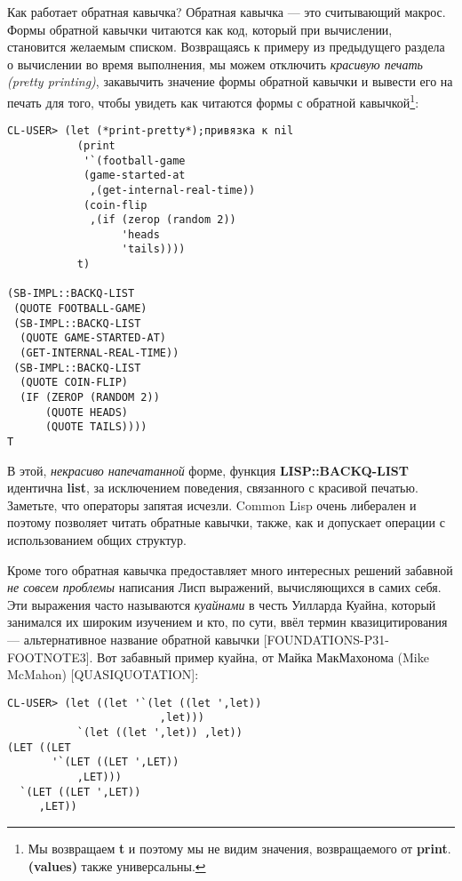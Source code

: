 Как работает обратная кавычка? Обратная кавычка --- это считывающий макрос. Формы обратной кавычки читаются как код, который при вычислении, становится желаемым списком. Возвращаясь к примеру из предыдущего раздела о вычислении во время выполнения, мы можем отключить \emph{красивую печать (pretty printing)}, закавычить значение формы обратной кавычки и вывести его на печать для того, чтобы увидеть как читаются формы с обратной кавычкой\footnote{Мы возвращаем \textbf{t} и поэтому мы не видим значения, возвращаемого от \textbf{print}. \textbf{(values)} также универсальны.}:

\begin{verbatim}
CL-USER> (let (*print-pretty*);привязка к nil
           (print
            '`(football-game
            (game-started-at
             ,(get-internal-real-time))
            (coin-flip
             ,(if (zerop (random 2))
                  'heads
                  'tails))))
           t)

(SB-IMPL::BACKQ-LIST 
 (QUOTE FOOTBALL-GAME) 
 (SB-IMPL::BACKQ-LIST 
  (QUOTE GAME-STARTED-AT) 
  (GET-INTERNAL-REAL-TIME)) 
 (SB-IMPL::BACKQ-LIST 
  (QUOTE COIN-FLIP) 
  (IF (ZEROP (RANDOM 2)) 
      (QUOTE HEADS) 
      (QUOTE TAILS)))) 
T
\end{verbatim}

В этой, \emph{некрасиво напечатанной} форме, функция {\textbf{LISP::BACKQ-LIST}} идентична \textbf{list}, за исключением поведения, связанного с красивой печатью. Заметьте, что операторы запятая исчезли. Common Lisp очень либерален и поэтому позволяет читать обратные кавычки, также, как и допускает операции с использованием общих структур.

Кроме того обратная кавычка предоставляет много интересных решений забавной \emph{не совсем проблемы} написания Лисп выражений, вычисляющихся в самих себя. Эти выражения часто называются \emph{куайнами} в честь Уилларда Куайна, который занимался их широким изучением и кто, по сути, ввёл термин квазицитирования --- альтернативное название обратной кавычки [FOUNDATIONS-P31-FOOTNOTE3]. Вот забавный пример куайна, от Майка МакМахонома (Mike McMahon) { [QUASIQUOTATION]}:

\begin{verbatim}
CL-USER> (let ((let '`(let ((let ',let))
                        ,let)))
           `(let ((let ',let)) ,let))
(LET ((LET
       '`(LET ((LET ',LET))
           ,LET)))
  `(LET ((LET ',LET))
     ,LET))
\end{verbatim}

